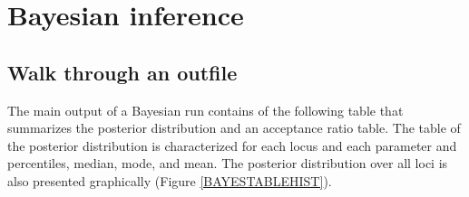 %

\section{Bayesian inference}

\subsection{Walk through an outfile}

The main output of a Bayesian run contains of the following table that summarizes the posterior distribution and an acceptance ratio table. The table of the posterior distribution is characterized for each locus and each parameter and percentiles, median, mode, and mean. The posterior distribution over all loci is also presented graphically (Figure \ref{BAYESTABLEHIST}). 


